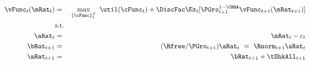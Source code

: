 \begin{eqnarray}
\vFunc_{t}(\mRat_{t}) & = & \max_{\{\cFunc\}_{t}^{T}}~  \util(\cFunc_{t}) +\DiscFac \Ex_{t}[\PGro_{t+1}^{1-\CRRA}\vFunc_{t+1}({\mRat}_{t+1})]   \\
& \mbox{s.t.} &  \label{eq:veqn}  
 \\ {\aRat}_{t} & = & \mRat_{t}-c_{t}   
 \\ {\bRat}_{t+1} & = & (\Rfree/\PGro_{t+1})\aRat_{t}  ~ = ~ \Rnorm_{t+1}\aRat_{t}   
\\ \mRat_{t+1} & = & \bRat_{t+1}+\tShkAll_{t+1}    %
\end{eqnarray}

